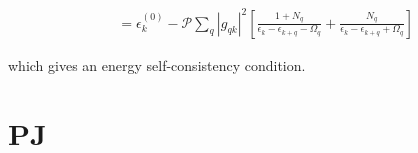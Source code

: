 \begin{frame}
\begin{align}
&= \epsilon_k^{(0)} - \mathcal{P} \sum_q\left|g_{q k}\right|^2\left[\frac{1+N_q}{\epsilon_k-\epsilon_{k+q}-\Omega_q}+\frac{N_q}{\epsilon_k-\epsilon_{k+q}+\Omega_q}\right]
\end{align}


which gives an energy self-consistency condition.

\end{frame}

\section{PJ}

